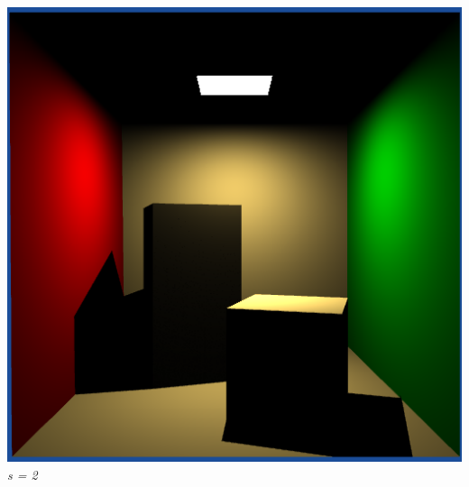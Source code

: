 \documentclass[a4,12pt]{article}
\begin{document}
\begin{center}
\begin{minipage}[b]{0.40\linewidth}
\begin{center}
				\includegraphics[width = \textwidth]{./Worksheet6/cornellblocks2.png}\\
				\textit{s = 2}
			\end{center}
		\end{minipage}
	\end{center}
	
\end{document}
